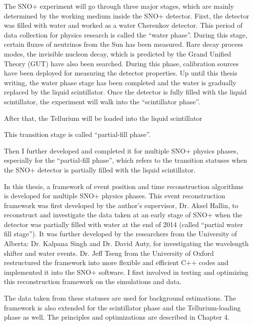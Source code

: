 The SNO+ experiment will go through three major stages, which are mainly determined by the working medium inside the SNO+ detector. First, the detector was filled with water and worked as a water Cherenkov detector. This period of data collection for physics research is called the ``water phase''. During this stage, certain fluxes of neutrinos from the Sun has been measured. Rare decay process modes, the invisible nucleon decay, which is predicted by the Grand Unified Theory (GUT) have also been searched. During this phase, calibration sources have been deployed for measuring the detector properties. Up until this thesis writing, the water phase stage has been completed and the water is gradually replaced by the liquid scintillator. Once the detector is fully filled with the liquid scintillator, the experiment will walk into the ``scintillator phase''.


After that, the Tellurium will be loaded into the liquid scintillator 


This transition stage is called ``partial-fill phase''.



Then I further developed and completed it for multiple SNO+ physics phases, especially for the ``partial-fill phase'', which refers to the transition statuses when the SNO+ detector is partially filled with the liquid scintillator.


In this thesis, a framework of event position and time reconstruction algorithms is developed for multiple SNO+ physics phases. This event reconstruction framework was first developed by the author's supervisor, Dr. Aksel Hallin, to reconstruct and investigate the data taken at an early stage of SNO+ when the detector was partially filled with water at the end of 2014 (called ``partial water fill stage'')\cite{partialWater}. It was further developed by the researchers from the University of Alberta: Dr. Kalpana Singh and Dr. David Auty, for investigating the wavelength shifter and water events\cite{davidPartialWater, kalpanaWLS, kalpanaWLS2, kalpanaMPFitter}. Dr. Jeff Tseng from the University of Oxford restructured the framework into more flexible and efficient C++ codes and implemented it into the SNO+ software\cite{jieMPW}. I first involved in testing and optimizing this reconstruction framework on the simulations and data.


The data taken from these statuses are used for background estimations. The framework is also extended for the scintillator phase and the Tellurium-loading phase as well. The principles and optimizations are described in Chapter 4.



